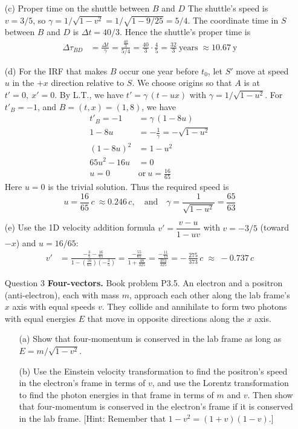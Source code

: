 \documentclass[12pt]{article}
\begin{document}
\begin{enumerate}
\item[(c)] Proper time on the shuttle between \(B\) and \(D\)
The shuttle’s speed is \(v=3/5\), so \(\gamma=1/\sqrt{1-v^2}=1/\sqrt{1-9/25}=5/4\). The coordinate time in \(S\) between \(B\) and \(D\) is \(\Delta t=40/3\). Hence the shuttle’s proper time is
\[
\begin{aligned}
\Delta\tau_{BD}
&=\frac{\Delta t}{\gamma}
= \frac{\frac{40}{3}}{5/4}
= \frac{40}{3}\cdot\frac{4}{5}
= \frac{32}{3}\ \text{years}\;\approx 10.67\ \text{y}
\end{aligned}
\]

\item[(d)] For the IRF that makes \(B\) occur one year before \(t_0\), let \(S'\) move at speed \(u\) in the \(+x\) direction relative to \(S\). We choose origins so that \(A\) is at \(t'=0,\ x'=0\). By L.T., we have \(t'=\gamma\,(t-ux)\) with \(\gamma=1/\sqrt{1-u^2}\). For \(t'_B=-1\), and \(B=(t,x)=(1,8)\), we have
\[
\begin{aligned}
t'_B=-1
&=\gamma\,(1-8u)\\
1-8u&=-\frac{1}{\gamma}=-\sqrt{1-u^2}\\
(1-8u)^2&=1-u^2\\
65u^2-16u&=0\\
u=0\ &\text{or}\ u=\frac{16}{65}
\end{aligned}
\]
Here \(u=0\) is the trivial solution. Thus the required speed is
\[
u=\frac{16}{65}\,c\ \approx 0.246\,c,
\quad\text{and}\quad
\gamma=\frac{1}{\sqrt{1-u^2}}=\frac{65}{63}
\]

\item[(e)] Use the 1D velocity addition formula \(v'=\dfrac{v-u}{1-uv}\) with \(v=-3/5\) (toward \(-x\)) and \(u=16/65\):
\[
\begin{aligned}
v'
&=\frac{-\frac{3}{5}-\frac{16}{65}}{1-\left(\frac{16}{65}\right)\left(-\frac{3}{5}\right)}
=\frac{-\frac{55}{65}}{1+\frac{48}{325}}
=\frac{-\frac{11}{13}}{\frac{373}{325}}
=-\,\frac{275}{373}\,c
\;\approx\; -0.737\,c
\end{aligned}
\]


\newpage

  \item[Question 3] \textbf{Four-vectors.} Book problem P3.5. An electron and a positron (anti-electron), each with mass $m$, approach each other along the lab frame's $x$ axis with equal speeds $v$. They collide and annihilate to form two photons with equal energies $E$ that move in opposite directions along the $x$ axis.
  \begin{enumerate}
    \item[(a)]
    Show that four-momentum is conserved in the lab frame as long as $E=m / \sqrt{1-v^2}$.
    \item[(b)]
    Use the Einstein velocity transformation to find the positron's speed in the electron's frame in terms of $v$, and use the Lorentz transformation to find the photon energies in that frame in terms of $m$ and $v$. Then show that four-momentum is conserved in the electron's frame if it is conserved in the lab frame. [Hint: Remember that $1-v^2=(1+v)(1-v)$.]
  \end{enumerate}
  

\end{enumerate}
\end{document}
